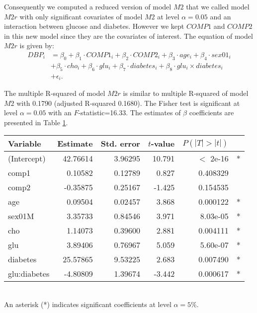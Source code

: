 Consequently we computed a reduced version of model $M2$ that we called model $M2r$ with only significant covariates of model $M2$ at level $\alpha=0.05$ and an interaction between glucose and diabetes. However we kept $COMP1$ and $COMP2$ in this new model since they are the covariates of interest. The equation of model $M2r$ is given by:
\begin{align*}
DBP_i &=  \beta_0 + \beta_1 \cdot COMP1_i+ \beta_2 \cdot COMP2_i + \beta_3 \cdot age_i + \beta_4 \cdot sex01_i  \\
& + \beta_5 \cdot cho_i + \beta_6 \cdot glu_i + \beta_7 \cdot diabetes_i + \beta_8 \cdot glu_i \times diabetes_i \\
& +\epsilon_i.
\end{align*}

The multiple R-squared of model $M2r$ is similar to multiple R-squared of model $M2$ with 0.1790 (adjusted R-squared 0.1680). The Fisher test is significant at level $\alpha=0.05$ with an $F$-statistic=16.33. The estimates of $\beta$ coefficients are presented in Table \ref{table:betasm2r}.

\begin{table}
\centering
{}
\begin{tabular}{lrrrrl}
\toprule
Variable & Estimate & Std. error & $t$-value & $P(|T|>|t|)$ &\\
\midrule
(Intercept)&  42.76614 &   3.96295 & 10.791 & $<$ 2e-16&*  \\
comp1   &      0.10582   & 0.12789   &0.827 &0.408329  &  \\ 
comp2   &     -0.35875&    0.25167  &-1.425& 0.154535   &  \\
age        &   0.09504 &   0.02457  & 3.868 &0.000122&*  \\
sex01M    &    3.35733 &   0.84546  & 3.971& 8.03e-05&*  \\
cho       &    1.14073  &  0.39600  & 2.881& 0.004111&*  \\
glu        &   3.89406    &0.76967 &  5.059& 5.60e-07&*  \\
diabetes    & 25.57865 &   9.53225 &  2.683& 0.007490&* \\ 
glu:diabetes &-4.80809  &  1.39674 & -3.442 &0.000617&*  \\
\bottomrule
\end{tabular}
\label{table:betasm2r} \\
{\footnotesize An asterisk (*) indicates significant coefficients at level $\alpha=5\%$.}
\end{table}

